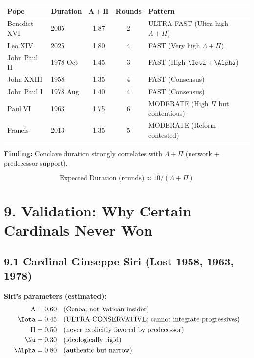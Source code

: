 \documentclass[11pt]{article}
\begin{document}
\begin{table}[h]
\centering
\begin{tabular}{|l|l|c|c|l|}
\hline
\textbf{Pope} & \textbf{Duration} & $\mathbf{\Lambda + \Pi}$ & \textbf{Rounds} & \textbf{Pattern} \\
\hline
Benedict XVI & 2005 & 1.87 & 2 & ULTRA-FAST (Ultra high $\Lambda + \Pi$) \\
Leo XIV & 2025 & 1.80 & 4 & FAST (Very high $\Lambda + \Pi$) \\
John Paul II & 1978 Oct & 1.45 & 3 & FAST (High $\Iota + \Alpha$) \\
John XXIII & 1958 & 1.35 & 4 & FAST (Consensus) \\
John Paul I & 1978 Aug & 1.40 & 4 & FAST (Consensus) \\
Paul VI & 1963 & 1.75 & 6 & MODERATE (High $\Pi$ but contentious) \\
Francis & 2013 & 1.35 & 5 & MODERATE (Reform contested) \\
\hline
\end{tabular}
\end{table}

\textbf{Finding:} Conclave duration strongly correlates with $\Lambda + \Pi$ (network + predecessor support).

$$\text{Expected Duration (rounds)} \approx 10 / (\Lambda + \Pi)$$

\section{9. Validation: Why Certain Cardinals Never Won}

\subsection{9.1 Cardinal Giuseppe Siri (Lost 1958, 1963, 1978)}

\textbf{Siri's parameters (estimated):}
\begin{align*}
\Lambda &= 0.60 \quad \text{(Genoa; not Vatican insider)} \\
\Iota &= 0.45 \quad \text{(ULTRA-CONSERVATIVE; cannot integrate progressives)} \\
\Pi &= 0.50 \quad \text{(never explicitly favored by predecessor)} \\
\Nu &= 0.30 \quad \text{(ideologically rigid)} \\
\Alpha &= 0.80 \quad \text{(authentic but narrow)}
\end{align*}
\end{document}
